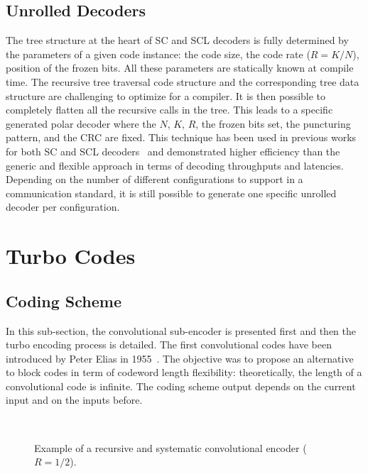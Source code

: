\subsection{Unrolled Decoders}

The tree structure at the heart of SC and SCL decoders is fully determined by
the parameters of a given code instance: the code size, the code rate ($R = K /
N$), position of the frozen bits. All these parameters are statically known at
compile time. The recursive tree traversal code structure and the corresponding
tree data structure are challenging to optimize for a compiler. It is then
possible to completely flatten all the recursive calls in the tree. This leads
to a specific generated polar decoder where the $N$, $K$, $R$, the frozen bits
set, the puncturing pattern, and the CRC are fixed. This technique has been used
in previous works for both SC and SCL decoders~\cite{Sarkis2014,Cassagne2015c,
Cassagne2016b,Sarkis2016} and demonstrated higher efficiency than the generic
and flexible approach in terms of decoding throughputs and latencies. Depending
on the number of different configurations to support in a communication
standard, it is still possible to generate one specific unrolled decoder per
configuration.

\section{Turbo Codes}
\label{sec:alg_turbo}

\subsection{Coding Scheme}

In this sub-section, the convolutional sub-encoder is presented first and then
the turbo encoding process is detailed. The first convolutional codes have been
introduced by Peter Elias in 1955~\cite{Elias1955}. The objective was to propose
an alternative to block codes in term of codeword length flexibility:
theoretically, the length of a convolutional code is infinite. The coding scheme
output depends on the current input and on the inputs before.

\begin{figure}[htp]
  \centering
  \quad
  \\
  \caption{Example of a recursive and systematic convolutional encoder ($R =
    1/2$).}
  \label{fig:alg_turbo_sub_encoder}
\end{figure}

